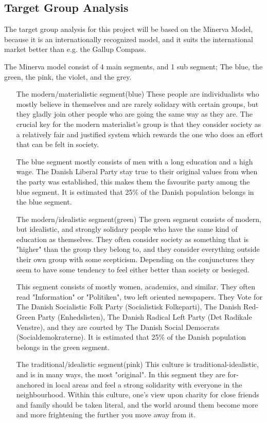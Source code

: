 \subsection{Target Group Analysis}
The target group analysis for this project will be based on the Minerva Model, because it is an internationally recognized model, and it suits the international market better than e.g. the Gallup Compass.

The Minerva model consist of 4 main segments, and 1 sub segment; The blue, the green, the pink, the violet, and the grey.
\begin{itemize}
\item[The modern/materialistic segment(blue)]
These people are individualists who mostly believe in themselves and are rarely solidary with certain groups, but they gladly join other people who are going the same way as they are. The crucial key for the modern materialist's group is that they consider society as a relatively fair and justified system which rewards the one who does an effort that can be felt in society.

The blue segment mostly consists of men with a long education and a high wage. The Danish Liberal Party stay true to their original values from when the party was established, this makes them the favourite party among the blue segment. It is estimated that 25\% of the Danish population belongs in the blue segment.

\item[The modern/idealistic segment(green)]
The green segment consists of modern, but idealistic, and strongly solidary people who have the same kind of education as themselves. They often consider society as something that is "higher" than the group they belong to, and they consider everything outside their own group with some scepticism. Depending on the conjunctures they seem to have some tendency to feel either better than society or besieged.

This segment consists of mostly women, academics, and similar. They often read "Information" or "Politiken", two left oriented newspapers. They Vote for The Danish Socialistic Folk Party (Socialistisk Folkeparti), The Danish Red-Green Party (Enhedslisten), The Danish Radical Left Party (Det Radikale Venstre), and they are courted by The Danish Social Democrats (Socialdemokraterne).
It is estimated that 25\% of the Danish population belongs in the green segment.

\item[The traditional/idealistic segment(pink)]
This culture is traditional-idealistic, and is in many ways, the most "original". In this segment they are for-anchored in local areas and feel a strong solidarity with everyone in the neighbourhood. Within this culture, one's view upon charity for close friends and family should be taken literal, and the world around them become more and more frightening the further you move away from it.


\end{itemize}
